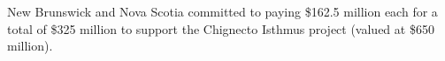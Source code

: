 \documentclass{article}
\begin{document}

New Brunswick and Nova Scotia committed to paying \$162.5 million each for a total of \$325 million to support the Chignecto Isthmus project (valued at \$650 million).
\end{document}

